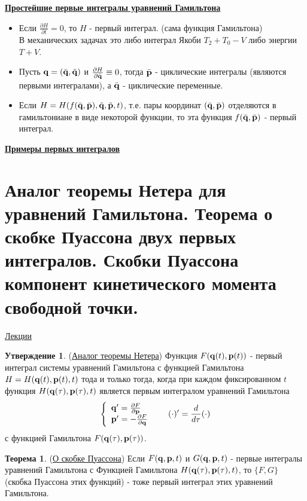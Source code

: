 \documentclass[specialist, subf, href, colorlinks=true, 12pt, times, mtpro, final]{disser}
\theoremstyle{definition}
\newtheorem{state}{Утверждение}[section]
\newtheorem{theorem}{Теорема}[section]
\begin{document}
	\textbf{\hyperlink {lects.19}{Простейшие первые интегралы уравнений Гамильтона}}
	\begin{itemize}
		\item Если $\frac{\partial H}{\partial t} = 0$, то $H$ - первый интеграл. (сама функция Гамильтона) \\
			В механических задачах это либо интеграл Якоби $T_2 + T_0 -V$ либо энергии $T+V$.
		\item Пусть $\mathbf{q} = (\bar{\mathbf{q}}, \tilde {\mathbf{q}})$ и $\frac{\partial H}{\partial \bar{\mathbf{q}}} \equiv 0$, тогда $\bar {\mathbf{p}}$ - циклические интегралы 	(являются первыми интегралами), а $\bar{\mathbf{q}}$ - циклические переменные. 
		\item Если $H = H(f(\bar{\mathbf{q}}, \bar{\mathbf{p}}), \tilde{\mathbf{q}}, \tilde{\mathbf{p}},t)$, т.е. пары координат $(\bar{\mathbf{q}}, \bar{\mathbf{p}})$ отделяются в гамильтониане в виде некоторой функции, то эта функция $f(\bar{\mathbf{q}}, \bar{\mathbf{p}})$ - первый интеграл.
	\end{itemize}
	\textbf {\hyperlink {lects.19}{Примеры первых интегралов}}
    
    
    
    \section{Аналог теоремы Нетера для уравнений Гамильтона. Теорема о скобке Пуассона двух первых интегралов. Скобки Пуассона компонент кинетического момента свободной точки.}
     \label{15}
    \hyperlink {lects.20}{Лекции} \\
    \begin{state}
    	(\hyperlink {lects.20}{Аналог теоремы Нетера}) Функция $F(\mathbf{q}(t),\mathbf{p}(t))$ - первый интеграл системы уравнений Гамильтона с функцией Гамильтона $H = H(\mathbf{q}(t), \mathbf{p}(t), t)$ тода и только тогда, когда при каждом фиксированном $t$ функция $H(\mathbf{q}(\tau), \mathbf{p}(\tau), t)$ является первым интегралом уравнений Гамильтона
    	$$
    		\left\{
    			\begin{array}{l}
    				\mathbf{q}' = \frac{\partial F}{\partial \mathbf{p}} \\
    				\mathbf{p}' = -\frac{\partial F}{\partial \mathbf{q}} \\
    			\end{array}
    		\right. \ \ \ \ \ (\cdot)' = \frac{d}{d\tau}(\cdot)
    	$$
    	с функцией Гамильтона $F(\mathbf{q}(\tau), \mathbf{p}(\tau))$.
    \end{state}

	\begin{theorem}
		(\hyperlink {lects.20}{О скобке Пуассона}) Если $F(\mathbf{q}, \mathbf{p}, t)$ и $G(\mathbf{q}, \mathbf{p}, t)$ - первые интегралы уравнений Гамильтона с Функцией Гамильтона $H(\mathbf{q}(\tau), \mathbf{p}(\tau), t)$, то $\{F,G\}$ (скобка Пуассона этих функций) - тоже первый интеграл этих уравнений Гамильтона.
	\end{theorem} 
\end{document}

